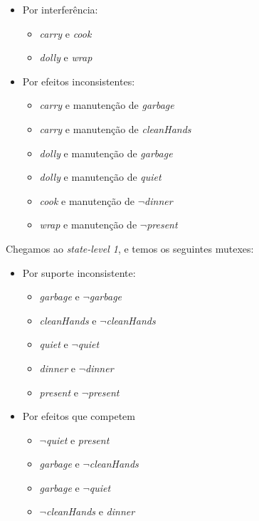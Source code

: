 \documentclass[12pt,letterpaper]{article}
\begin{document}
	\begin{itemize}
		\item Por interferência:
		\begin{itemize}
			\item \textit{carry} e \textit{cook}
			\item \textit{dolly} e \textit{wrap}
		\end{itemize}
		\item Por efeitos inconsistentes:
		\begin{itemize}
			\item \textit{carry} e manutenção de \textit{garbage}
			\item \textit{carry} e manutenção de \textit{cleanHands}
			\item \textit{dolly} e manutenção de \textit{garbage}
			\item \textit{dolly} e manutenção de \textit{quiet}
			\item \textit{cook} e manutenção de \textit{$\lnot$dinner}
			\item \textit{wrap} e manutenção de \textit{$\lnot$present}
		\end{itemize}
	\end{itemize}
	
	
	Chegamos ao \textit{state-level 1}, e temos os seguintes mutexes:

	\begin{itemize}
		\item Por suporte inconsistente:
		\begin{itemize}
			\item \textit{garbage} e \textit{$\lnot$garbage}
			\item \textit{cleanHands} e \textit{$\lnot$cleanHands}
			\item \textit{quiet} e \textit{$\lnot$quiet}
			\item \textit{dinner} e \textit{$\lnot$dinner}
			\item \textit{present} e \textit{$\lnot$present}
		\end{itemize}
		\item Por efeitos que competem
		\begin{itemize}
			\item \textit{$\lnot$quiet} e \textit{present}
			\item \textit{garbage} e \textit{$\lnot$cleanHands}
			\item \textit{garbage} e \textit{$\lnot$quiet}
			\item \textit{$\lnot$cleanHands} e \textit{dinner}
		\end{itemize}
	\end{itemize}
	
\end{document}
